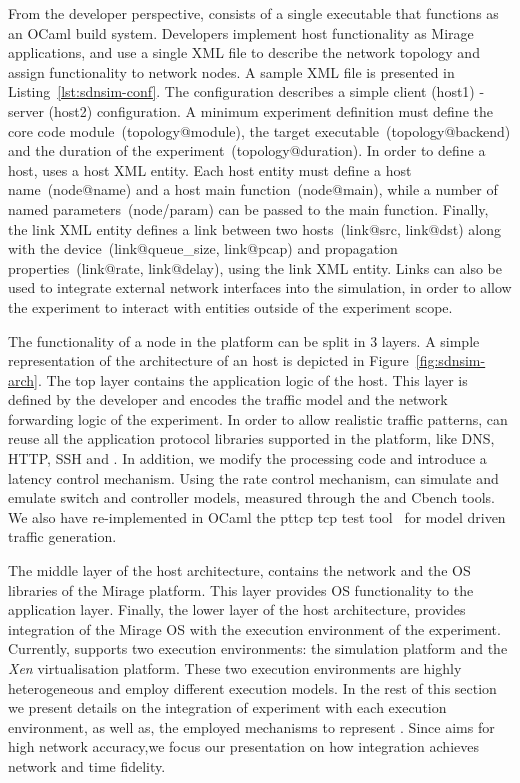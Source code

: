 From the developer perspective, \sdnsim consists of a single executable
that functions as an OCaml build system. Developers implement host
functionality as Mirage applications, and use a single XML file
to describe the network topology and assign functionality to network nodes.
A sample XML file is presented in Listing~\ref{lst:sdnsim-conf}. The
configuration describes a simple client (host1) - server (host2) configuration.
A minimum experiment definition must define the core
code module~(topology@module), the target executable~(topology@backend) and the
duration of the experiment~(topology@duration). In order to define a host,
\sdnsim uses a host XML entity. Each host entity must define a host
name~(node@name) and a host main function~(node@main), while a number of named
parameters~(node/param) can be passed to the main function. Finally, the link
XML entity defines a link between two hosts~(link@src, link@dst) along with the
device~(link@queue\_size, link@pcap) and propagation properties~(link@rate,
link@delay), using the link XML entity. Links can also be used to integrate
external network interfaces into the simulation, in order to allow the experiment to
interact with entities outside of the experiment scope.

The functionality of a node in the \sdnsim platform can be split in 3 layers.  A
simple representation of the architecture of an \sdnsim host is depicted in
Figure~\ref{fig:sdnsim-arch}.  The top layer contains the application logic of
the host. This layer is defined by the developer and encodes the traffic model
and the network forwarding logic of the experiment. In order to allow realistic
traffic patterns, \sdnsim can reuse all the application protocol libraries
supported in the \mirage platform, like DNS, HTTP, SSH and \of. In addition,
we modify the \of processing code and introduce a latency control mechanism. 
Using the rate control mechanism, \sdnsim can simulate and emulate
switch and controller models, measured through the \oflops and Cbench tools.
We also have re-implemented in OCaml the pttcp tcp test tool~\cite{pttcp} for
model driven traffic generation. 

The middle layer of the host architecture, contains the network and the OS
libraries of the Mirage platform. This layer provides OS functionality to the
application layer. Finally, the lower layer of the host architecture, provides
integration of the Mirage OS with the execution environment of the experiment.
Currently, \sdnsim supports two execution environments: the {\it {}}
simulation platform  and the {\it Xen} virtualisation platform. These two
execution environments are highly heterogeneous and employ different execution
models.  In the rest of this section we present details on the integration of
\sdnsim experiment with each execution environment, as well as, the employed
mechanisms to represent 
.  Since \sdnsim aims for
high network accuracy,we focus our presentation on how integration achieves 
network and time fidelity.

